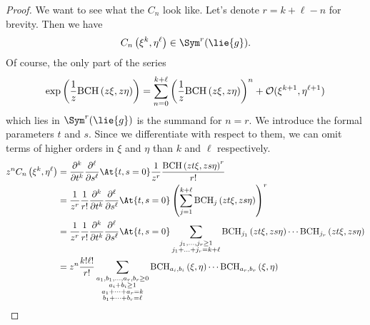 \begin{proof}
	We want to see what the $C_n$ look like. Let's denote $r = k 
	+ \ell - n$ for brevity. Then we have
	\begin{equation*}
		C_n \left( \xi^k, \eta^{\ell} \right)
		\in \Sym^r(\lie{g}).
	\end{equation*}
	Of course, the only part of the series
	\begin{equation*}
		\exp\left(
			\frac{1}{z} \mathrm{BCH}\left(z \xi, z \eta\right)
		\right)
		=
		\sum\limits_{n = 0}^{k + \ell}
		\left(
			\frac{1}{z} \mathrm{BCH}\left(z \xi, z \eta\right)
		\right)^n
		+ \mathcal{O}(\xi^{k + 1}, \eta^{\ell + 1})
	\end{equation*} 
	which lies in $\Sym^r(\lie{g})$ is the summand for 
	$n = r $. We introduce the formal parameters $t$ and $s$.
	Since we differentiate with respect to them, we can omit 
	terms of higher orders in $\xi$ and $\eta$ than $k$ 
	and $\ell$ respectively.
    \begin{align*}
        z^n C_n \left( \xi^k, \eta^{\ell} \right)
        & =
        \frac{\partial^k}{\partial t^k}
        \frac{\partial^{\ell}}{\partial s^{\ell}}
        \At{t,s = 0}
        \frac{1}{z^r}
        \frac{\bch{z t \xi}{z s \eta}^r    }{r!}
        \\
        & =
        \frac{1}{z^r}
        \frac{1}{r!}
        \frac{\partial^k}{\partial t^k}
        \frac{\partial^{\ell}}{\partial s^{\ell}}
        \At{t,s = 0}
        \left(
            \sum\limits_{j = 1}^{k + \ell}
            \bchpart{j}{z t \xi}{z s \eta}
        \right)^r
        \\
        & =
        \frac{1}{z^r}
        \frac{1}{r!}
        \frac{\partial^k}{\partial t^k}
        \frac{\partial^{\ell}}{\partial s^{\ell}}
        \At{t,s = 0}
        \sum\limits_{\substack{
        	j_1, \ldots, j_r \geq 1 \\
            j_1 + \ldots + j_r = k + \ell
        }}
        \bchpart{j_1}{z t \xi}{z s \eta} 
        \cdots
        \bchpart{j_r}{z t \xi}{z s \eta}
        \\
        & =
        z^n
        \frac{k! \ell!}{r!}
        \sum\limits_{\substack{a_1, b_1, \ldots, a_r, b_r \geq 0 \\
            a_i + b_i \geq 1 \\
            a_1 + \cdots + a_r = k \\
            b_1 + \cdots + b_r = \ell
        }}
        \bchparts{a_i}{b_i}{\xi}{\eta}
        \cdots
        \bchparts{a_r}{b_r}{\xi}{\eta}
    \end{align*}

\end{proof}
